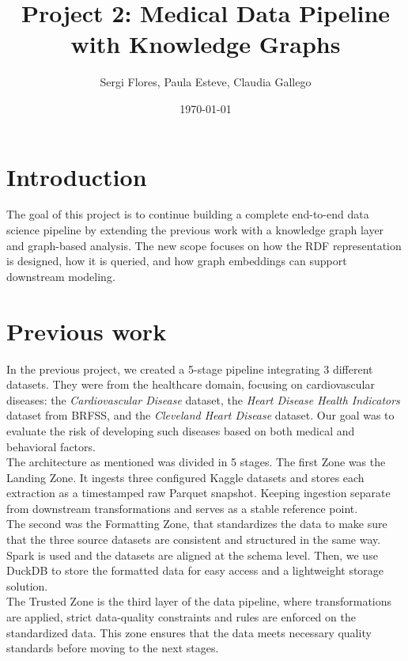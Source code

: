 \documentclass[11pt,a4paper]{article}
\title{Project 2: Medical Data Pipeline with Knowledge Graphs}
\author{Sergi Flores, Paula Esteve, Claudia Gallego}
\date{\today}
\begin{document}
\maketitle

\section{Introduction}
The goal of this project is to continue building a complete end-to-end data science pipeline by extending the previous work with a knowledge graph layer and graph-based analysis. The new scope focuses on how the RDF representation is designed, how it is queried, and how graph embeddings can support downstream modeling.

\section{Previous work}

In the previous project, we created a 5-stage pipeline integrating 3 different datasets. They were from the healthcare domain, focusing on cardiovascular diseases: the \textit{Cardiovascular Disease} dataset, the \textit{Heart Disease Health Indicators} dataset from BRFSS, and the \textit{Cleveland Heart Disease} dataset. Our goal was to evaluate the risk of developing such diseases based on both medical and behavioral factors.\\

The architecture as mentioned was divided in 5 stages. The first Zone was the Landing Zone. It ingests three configured Kaggle datasets and stores each extraction as a timestamped raw Parquet snapshot. Keeping ingestion separate from downstream transformations and serves as a stable reference point.\\

The second was the Formatting Zone, that standardizes the data to make sure that the three source datasets are consistent and structured in the same way. Spark is used and the datasets are aligned at the schema level. Then, we use DuckDB to store the formatted data for easy access and a lightweight storage solution.\\

The Trusted Zone is the third layer of the data pipeline, where transformations are applied, strict data-quality constraints and rules are enforced on the standardized data. This zone ensures that the data meets necessary quality standards before moving to the next stages.\\
\end{document}
